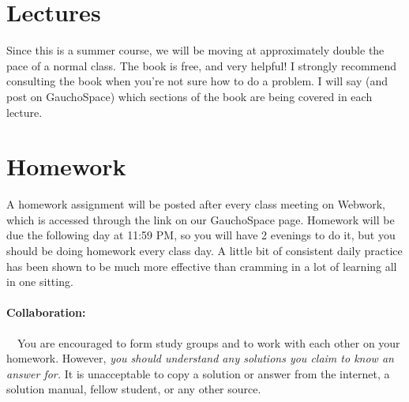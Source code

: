 \documentclass[11pt,letterpaper]{article}
\begin{document}
\section*{Lectures}
Since this is a summer course, we will be moving at approximately double the pace of a normal class. The book is free, and very helpful! I strongly recommend consulting the book when you're not sure how to do a problem. I will say (and post on GauchoSpace) which sections of the book are being covered in each lecture. 

\section*{Homework}
A homework assignment will be posted after every class meeting on Webwork, which is accessed through the link on our GauchoSpace page. Homework will be due the following day at 11:59 PM, so you will have 2 evenings to do it, but you should be doing homework every class day. A little bit of consistent daily practice has been shown to be much more effective than cramming in a lot of learning all in one sitting.  

\paragraph*{Collaboration:}\ \ You are encouraged to form study groups
and to work with each other on your homework.  However, \emph{you
  should understand any solutions you claim to know an answer for.}  It
is unacceptable to copy a solution or answer from the internet, a
solution manual, fellow student, or any other source.

\end{document}
